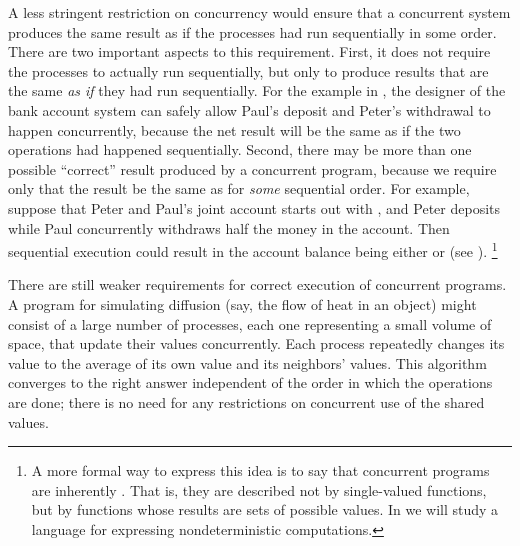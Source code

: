 A less stringent restriction on concurrency would ensure that a concurrent system produces the same result as if the processes had run sequentially in some order.
There are two important aspects to this requirement.
First, it does not require the processes to actually run sequentially, but only to produce results that are the same \emph{as if} they had run sequentially.
For the example in , the designer of the bank account system can safely allow Paul’s deposit and Peter’s withdrawal to happen concurrently, because the net result will be the same as if the two operations had happened sequentially.
Second, there may be more than one possible “correct” result produced by a concurrent program, because we require only that the result be the same as for \emph{some} sequential order.
For example, suppose that Peter and Paul’s joint account starts out with , and Peter deposits  while Paul concurrently withdraws half the money in the account.
Then sequential execution could result in the account balance being either  or  (see ).%
\footnote{
	\label{Footnote 39} A more formal way to express this idea is to say that concurrent programs are inherently .
	That is, they are described not by single-valued functions, but by functions whose results are sets of possible values.
	In  we will study a language for expressing nondeterministic computations.
}

There are still weaker requirements for correct execution of concurrent programs.
A program for simulating diffusion (say, the flow of heat in an object) might consist of a large number of processes, each one representing a small volume of space, that update their values concurrently.
Each process repeatedly changes its value to the average of its own value and its neighbors’ values.
This algorithm converges to the right answer independent of the order in which the operations are done;
there is no need for any restrictions on concurrent use of the shared values.



